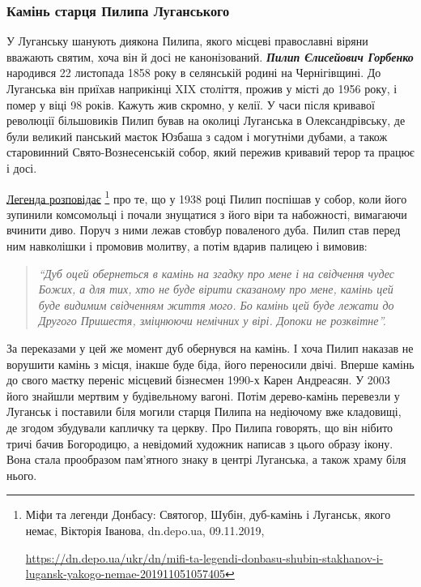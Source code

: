\subsubsection{Камінь старця Пилипа Луганського}


У Луганську шанують диякона Пилипа, якого місцеві православні віряни вважають
святим, хоча він й досі не канонізований. \emph{\textbf{Пилип Єлисейович Горбенко}} народився
22 листопада 1858 року в селянській родині на Чернігівщині. До Луганська він
приїхав наприкінці XIX століття, прожив у місті до 1956 року, і помер у віці 98
років. Кажуть жив скромно, у келії. У часи після кривавої революції більшовиків
Пилип бував на околиці Луганська в Олександрівську, де були великий панський
маєток Юзбаша з садом і могутніми дубами, а також старовинний
Свято-Вознесенській собор, який пережив кривавий терор та працює і досі.

\href{https://dn.depo.ua/ukr/dn/mifi-ta-legendi-donbasu-shubin-stakhanov-i-lugansk-yakogo-nemae-201911051057405}{Легенда розповідає}%
\footnote{Міфи та легенди Донбасу: Святогор, Шубін, дуб-камінь і Луганськ, якого немає, Вікторія Іванова, dn.depo.ua, 09.11.2019, \par%
\url{https://dn.depo.ua/ukr/dn/mifi-ta-legendi-donbasu-shubin-stakhanov-i-lugansk-yakogo-nemae-201911051057405}%
}
про те, що у 1938 році Пилип поспішав у собор, коли його
зупинили комсомольці і почали знущатися з його віри та набожності, вимагаючи
вчинити диво. Поруч з ними лежав стовбур поваленого дуба. Пилип став перед ним
навколішки і промовив молитву, а потім вдарив палицею і вимовив: 

\begin{quote}
\em\enquote{Дуб оцей
обернеться в камінь на згадку про мене і на свідчення чудес Божих, а для тих,
хто не буде вірити сказаному про мене, камінь цей буде видимим свідченням життя
мого. Бо камінь цей буде лежати до Другого Пришестя, зміцнюючи немічних у вірі.
Допоки не розквітне}. 
\end{quote}

За переказами у цей же момент дуб обернувся на камінь. І
хоча Пилип наказав не ворушити камінь з місця, інакше буде біда, його
переносили двічі. Вперше камінь до свого маєтку переніс місцевий бізнесмен
1990-х Карен Андреасян. У 2003 його знайшли мертвим у будівельному вагоні.
Потім дерево-камінь перевезли у Луганськ і поставили біля могили старця Пилипа
на недіючому вже кладовищі, де згодом збудували капличку та церкву. Про Пилипа
говорять, що він нібито тричі бачив Богородицю, а невідомий художник написав з
цього образу ікону. Вона стала прообразом пам'ятного знаку в центрі Луганська,
а також храму біля нього.

